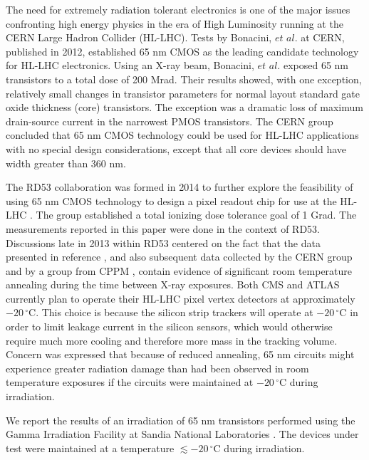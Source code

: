 The need for extremely radiation tolerant electronics is one of the major issues confronting high energy physics in the era of High Luminosity running at the CERN \cite{CERN} Large Hadron Collider (HL-LHC).
Tests by Bonacini, $\textit{et al.}$ \cite{Bonacini} at CERN, published in 2012, established 65 nm CMOS as the leading candidate technology for HL-LHC electronics.  Using an X-ray beam, Bonacini, $\textit{et al.}$ exposed 65 nm transistors to a total dose of 200 Mrad.  Their results showed, with one exception, relatively small changes in transistor parameters for normal layout standard gate oxide thickness (core) transistors.  The exception was a dramatic loss of maximum drain-source current in the narrowest PMOS transistors.  The CERN group concluded that 65 nm CMOS technology could be used for HL-LHC applications with no special design considerations, except that all core devices should have width greater than 360 nm.

The RD53 collaboration was formed in 2014 to further explore the feasibility of using 65 nm CMOS technology to design a pixel readout chip for use at the HL-LHC \cite{RD53}.  
 The group established a total ionizing dose tolerance goal of 1 Grad.  The measurements reported in this paper were done in the context of RD53.  Discussions late in 2013 within RD53 centered on the fact that the data presented in reference \cite{Bonacini}, and also subsequent data collected by the CERN group and by a group from CPPM \cite{CPPM}, contain evidence of significant room temperature annealing during the time between X-ray exposures.  Both CMS and ATLAS currently plan to operate their HL-LHC pixel vertex detectors at approximately  $-20\,^{\circ}\mathrm{C}$.   
This choice is because the silicon strip trackers will operate at $-20\,^{\circ}\mathrm{C}$ in order to limit leakage current in the silicon sensors, which would otherwise require much more cooling and therefore more mass in the tracking volume.  Concern was expressed that because of reduced annealing, 65 nm circuits might experience greater radiation damage than had been observed in room temperature exposures if the circuits were maintained at  $-20\,^{\circ}\mathrm{C}$ during irradiation.

We report the results of an irradiation of 65 nm transistors performed using the Gamma Irradiation Facility\cite{GIF} at Sandia National Laboratories \cite{Sandia}.  The devices under test were maintained at a temperature $\lesssim -20\,^{\circ}\mathrm{C}$ during irradiation.